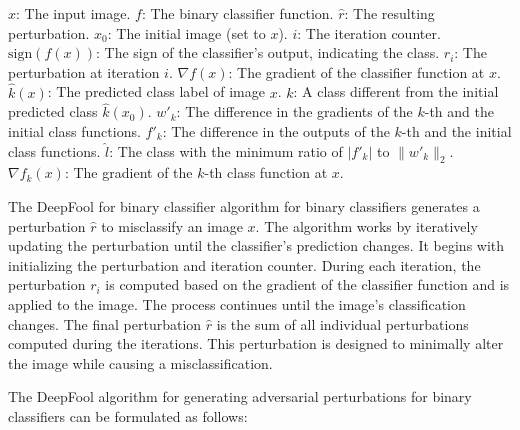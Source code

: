 
$x$: The input image. 
$f$: The binary classifier function. 
$\hat{r}$: The resulting perturbation. 
$x_0$: The initial image (set to $x$).
$i$: The iteration counter. 
$\text{sign}(f(x))$: The sign of the classifier's output, indicating the class. 
$r_i$: The perturbation at iteration $i$. 
$\nabla f(x)$: The gradient of the classifier function at $x$.
$\hat{k}(x)$: The predicted class label of image $x$. 
$k$: A class different from the initial predicted class $\hat{k}(x_0)$. 
$w'_k$: The difference in the gradients of the $k$-th and the initial class functions. 
$f'_k$: The difference in the outputs of the $k$-th and the initial class functions. 
$\hat{l}$: The class with the minimum ratio of $|f'_k|$ to $\|w'_k\|_2$.
$\nabla f_k(x)$: The gradient of the $k$-th class function at $x$.

The DeepFool for binary classifier algorithm for binary classifiers generates a perturbation $\hat{r}$ to misclassify an image $x$. The algorithm works by iteratively updating the perturbation until the classifier's prediction changes. It begins with initializing the perturbation and iteration counter. During each iteration, the perturbation $r_i$ is computed based on the gradient of the classifier function and is applied to the image. The process continues until the image's classification changes. The final perturbation $\hat{r}$ is the sum of all individual perturbations computed during the iterations. This perturbation is designed to minimally alter the image while causing a misclassification.

The DeepFool algorithm for generating adversarial perturbations for binary classifiers can be formulated as follows:

